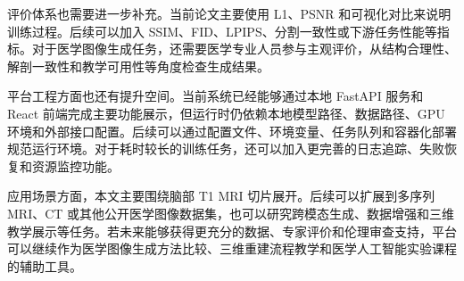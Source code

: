 评价体系也需要进一步补充。当前论文主要使用 L1、PSNR 和可视化对比来说明训练过程。后续可以加入 SSIM、FID、LPIPS、分割一致性或下游任务性能等指标。对于医学图像生成任务，还需要医学专业人员参与主观评价，从结构合理性、解剖一致性和教学可用性等角度检查生成结果。

平台工程方面也还有提升空间。当前系统已经能够通过本地 FastAPI 服务和 React 前端完成主要功能展示，但运行时仍依赖本地模型路径、数据路径、GPU 环境和外部接口配置。后续可以通过配置文件、环境变量、任务队列和容器化部署规范运行环境。对于耗时较长的训练任务，还可以加入更完善的日志追踪、失败恢复和资源监控功能。

应用场景方面，本文主要围绕脑部 T1 MRI 切片展开。后续可以扩展到多序列 MRI、CT 或其他公开医学图像数据集，也可以研究跨模态生成、数据增强和三维教学展示等任务。若未来能够获得更充分的数据、专家评价和伦理审查支持，平台可以继续作为医学图像生成方法比较、三维重建流程教学和医学人工智能实验课程的辅助工具。
